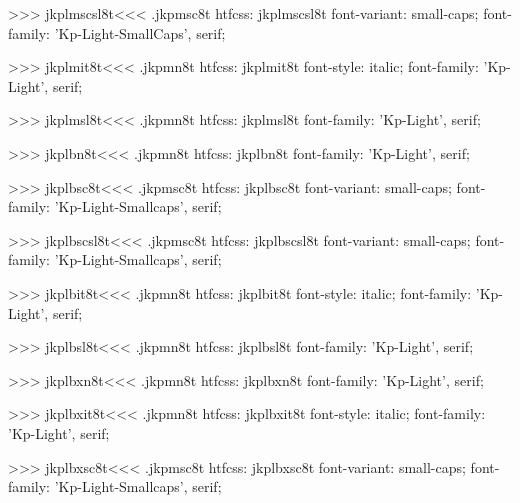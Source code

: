 >>>
\<jkplmscsl8t\><<<
.jkpmsc8t
htfcss:  jkplmscsl8t  font-variant: small-caps; font-family: 'Kp-Light-SmallCaps', serif;

>>>
\<jkplmit8t\><<<
.jkpmn8t
htfcss:  jkplmit8t  font-style: italic; font-family: 'Kp-Light', serif;

>>>
\<jkplmsl8t\><<<
.jkpmn8t
htfcss:  jkplmsl8t  font-family: 'Kp-Light', serif;

>>>
\<jkplbn8t\><<<
.jkpmn8t
htfcss:  jkplbn8t  font-family: 'Kp-Light', serif;

>>>
\<jkplbsc8t\><<<
.jkpmsc8t
htfcss:  jkplbsc8t  font-variant: small-caps; font-family: 'Kp-Light-Smallcaps', serif;

>>>
\<jkplbscsl8t\><<<
.jkpmsc8t
htfcss:  jkplbscsl8t  font-variant: small-caps; font-family: 'Kp-Light-Smallcaps', serif;

>>>
\<jkplbit8t\><<<
.jkpmn8t
htfcss:  jkplbit8t  font-style: italic; font-family: 'Kp-Light', serif;

>>>
\<jkplbsl8t\><<<
.jkpmn8t
htfcss:  jkplbsl8t  font-family: 'Kp-Light', serif;

>>>
\<jkplbxn8t\><<<
.jkpmn8t
htfcss:  jkplbxn8t  font-family: 'Kp-Light', serif;

>>>
\<jkplbxit8t\><<<
.jkpmn8t
htfcss:  jkplbxit8t  font-style: italic; font-family: 'Kp-Light', serif;

>>>
\<jkplbxsc8t\><<<
.jkpmsc8t
htfcss:  jkplbxsc8t  font-variant: small-caps; font-family: 'Kp-Light-Smallcaps', serif;

